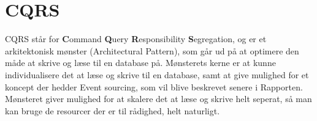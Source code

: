 \chapter{CQRS}

CQRS står for \textbf{C}ommand \textbf{Q}uery \textbf{R}esponsibility \textbf{S}egregation, og er et arkitektonisk mønster (Architectural Pattern), som går ud på at optimere den måde at skrive og læse til en database på. Mønsterets kerne er at kunne individualisere det at læse og skrive til en database, samt at give mulighed for et koncept der hedder Event sourcing, som vil blive beskrevet senere i Rapporten. Mønsteret giver mulighed for at skalere det at læse og skrive helt seperat, så man kan bruge de resourcer der er til rådighed, helt naturligt.
